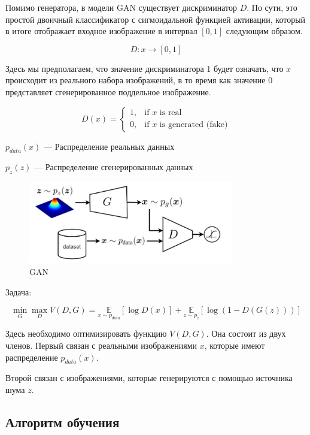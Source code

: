 \documentclass{article}
\theoremstyle{definition}
\theoremstyle{theorem}
\theoremstyle{remark}
\theoremstyle{theorem}
\theoremstyle{example}
\theoremstyle{theorem}
\theoremstyle{theorem}
\theoremstyle{theorem}
\theoremstyle{theorem}
\begin{document}
	

	Помимо генератора, в модели GAN существует дискриминатор $D$. По сути, это простой двоичный классификатор с сигмоидальной функцией активации, который в итоге отображает входное изображение в интервал $[0,1]$ следующим образом.
	
		$$D:x\rightarrow [0,1]$$
	
	 Здесь мы предполагаем, что значение дискриминатора 1 будет означать, что $x$ происходит из реального набора изображений, в то время как значение 0 представляет сгенерированное поддельное изображение.
	 
	 $$D(x) = \begin{cases} 1, & \mbox{if } x\mbox{ is real} \\ 0, & \mbox{if } x\mbox{ is generated (fake)} \end{cases}$$
	 
	 
 	$p_{data}(x)$ --- Распределение реальных данных
 	
 	$p_z(z)$ --- Распределение сгенерированных данных
 	
 	\begin{figure}[!ht]
 		\centering
 		\includegraphics[width=0.8\textwidth]{img/scheme_2.png}
 		\caption {GAN}
 		\label{fig:scheme_2}
 	\end{figure}


Задача:

$$\underset{G}{\min} \underset{D}{\max} V\left(D,G\right) = \underset{x\sim p_{data}}{ \mathbb{E}} \left[\log D(x)\right] + \underset{z\sim p_z}{ \mathbb{E}} \left[\log\left(1-D\left(G(z)\right)\right)\right]$$

Здесь необходимо оптимизировать функцию $V(D,G)$. Она состоит из двух членов. Первый связан с реальными изображениями $x$, которые имеют распределение $p_{data} (x)$. 

Второй связан с изображениями, которые генерируются с помощью источника шума $z$. 

\subsection{Алгоритм обучения}
\end{document}
